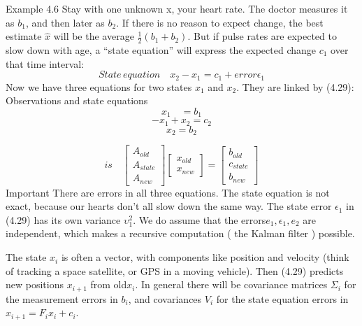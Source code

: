 	Example 4.6\; Stay with one unknown x, your heart rate. The doctor measures it as $b_1$,
	and then later as $b_2$. If there is no reason to expect change, the best estimate $\hat{x}$ will be the average $\frac{1}{2}(b_1+b_2)$. But if pulse rates are expected to slow down with age, a “state equation” will express the expected change $c_1$ over that time interval:
	\begin{equation}
	State\, equation \quad
	x_2-x_1=c_1+error\epsilon_1
	\end{equation}
	Now we have three equations for two states $x_1$ and $x_2$. They are linked by (4.29):
	Observations and state equations
	\begin{equation}
	x_1 \quad =b_1 
	\end{equation}
	\begin{equation*}
	-x_1+x_2=c_2 
	\end{equation*}
	\begin{equation*}
	 x_2 = b_2
	\end{equation*}
	
	\begin{equation*}
	is \quad
	\begin{bmatrix}
	A_{old} \\ A_{state} \\ A_{new}
	\end{bmatrix}
	\begin{bmatrix}
	x_{old}  \\ x_{new}
	\end{bmatrix}
	=
	\begin{bmatrix}
	b_{old} \\ c_{state} \\ b_{new}
	\end{bmatrix}
	\end{equation*} 
	Important There are errors in all three equations. The state equation is not exact, because
	our hearts don't all slow down the same way. The state error $\epsilon_1$ in (4.29) has its own variance $\upsilon^2_1$. We do assume that the errors$e_1,\epsilon_1,e_2$ are independent, which makes a recursive computation ( the Kalman filter ) possible.
	
	The state $x_i$ is often a vector, with components like position and velocity (think of
	tracking a space satellite, or GPS in a moving vehicle). Then (4.29) predicts new positions
	$x_{i+1}$ from old$x_{i}$. In general there will be covariance matrices $\Sigma_i$ for the measurement errors in $b_i$, and covariances $V_i$ for the state equation errors in $x_{i+1}=F_ix_i+c_i$.
	
